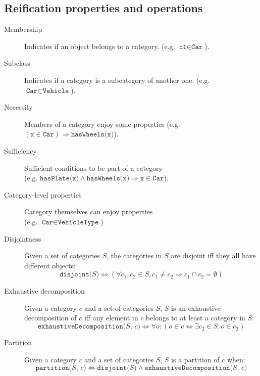 \subsection{Reification properties and operations}
\begin{description}
    \item[Membership] 
        Indicates if an object belongs to a category.
        (e.g. $\texttt{c1} \in \texttt{Car}$).

    \item[Subclass] 
        Indicates if a category is a subcategory of another one.
        (e.g. $\texttt{Car} \subset \texttt{Vehicle}$).

    \item[Necessity] 
        Members of a category enjoy some properties 
        (e.g. $(\text{x} \in \texttt{Car}) \Rightarrow \texttt{hasWheels(x)}$).

    \item[Sufficiency] 
        Sufficient conditions to be part of a category\\
        (e.g. $\texttt{hasPlate(x)} \land \texttt{hasWheels(x)} \Rightarrow \texttt{x} \in \texttt{Car}$).

    \item[Category-level properties] 
        Category themselves can enjoy properties\\
        (e.g. $\texttt{Car} \in \texttt{VehicleType}$)

    \item[Disjointness] 
        Given a set of categories $S$, the categories in $S$ are disjoint iff they all have different objects:
        \[ \texttt{disjoint($S$)} \iff (\forall c_1, c_2 \in S, c_1 \neq c_2 \Rightarrow c_1 \cap c_2 = \emptyset) \]

    \item[Exhaustive decomposition] 
        Given a category $c$ and a set of categories $S$, $S$ is an exhaustive decomposition of $c$ iff
        any element in $c$ belongs to at least a category in $S$:
        \[ \texttt{exhaustiveDecomposition($S$, $c$)} \iff \forall o: (o \in c \iff \exists c_2 \in S: o \in c_2) \]

    \item[Partition] 
        Given a category $c$ and a set of categories $S$, $S$ is a partition of $c$ when:
        \[ \texttt{partition($S$, $c$)} \iff \texttt{disjoint($S$)} \land \texttt{exhaustiveDecomposition($S$, $c$)} \]
\end{description}


